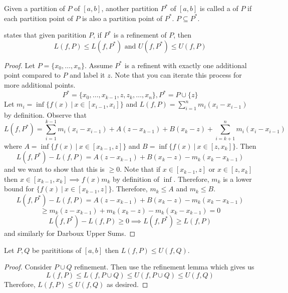 \documentclass[12pt]{scrartcl}
\begin{document}
\begin{definition}
  Given a partition of $P$ of $[a,b]$, another 
  partition $P^*$ of $[a,b]$ is called a  of $P$
  if each partition point of $P$ is also a partition point of $P^*$. $P \subseteq P^*$.
\end{definition}

\begin{lemma}
   states that given paritition $P$, 
  if $P^*$ is a refinement of $P$, then 
  \[L(f, P) \leq L(f, P^*) \text{ and } U(f, P^*) \leq U(f, P)\]
  \begin{proof}
    Let $P = \{x_0, \ldots, x_n\}$. Assume $P^*$ is a refinent with 
    exactly one additional point compared to $P$ and label it $z$. 
    Note that you can iterate this process for more additional points.
    \[P^* = \{x_0, \ldots, x_{k-1}, z, z_k, \ldots, x_n\}, P^* = P \cup \{z\}\]
    Let $m_i = \inf\{f(x) \ | \ x \in [x_{i-1}, x_i]\}$ and $L(f, P) = \sum_{i=1}^n m_i(x_i - x_{i-1})$ 
    by definition. Observe that 
    \[L(f, P^*) = \sum_{i=1}^{k-1} m_i(x_i - x_{i-1}) + A(z - x_{k-1}) + B(x_k - z) + \sum_{i=k+1}^n m_i(x_i - x_{i-1})\]
    where $A = \inf\{f(x) \ | \ x \in [x_{k-1}, z]\}$ and 
    $B = \inf\{f(x) \ | \ x \in [z, x_k]\}$. Then 
    \[L(f, P^*) - L(f, P) = A(z - x_{k-1}) + B(x_k - z) - m_k(x_k - x_{k-1})\]
    and we want to show that this is $\geq 0$. Note that if $x \in [x_{k-1}, z]$ or $x \in [z, x_k]$
    then $x \in [x_{k-1}, x_k] \implies f(x) m_k$ by definition of $\inf$. 
    Therefore, $m_k$ is a lower bound for $\{f(x) \ | \ x \in [x_{k-1}, z]\}$. Therefore, 
    $m_k \leq A$ and $m_k \leq B$. 
    \[L(f, P^*) - L(f, P) = A(z-x_{k-1}) + B(x_k - z) - m_k(x_k - x_{k-1})\]
    \[\geq m_k(z-x_{k-1}) + m_k(x_k - z) - m_k(x_k - x_{k-1}) = 0\]
    \[L(f, P^*) - L(f, P) \geq 0 \implies L(f, P^*) \geq L(f, P)\]
    and similarly for Darboux Upper Sums.
  \end{proof}
\end{lemma}

\begin{corollary}
  Let $P, Q$ be parititions of $[a,b]$ then 
  $L(f, P) \leq U(f, Q)$. 

  \begin{proof}
  Consider $P \cup Q$ refinement. Then use the refinement lemma which gives us 
  \[L(f, P) \leq L(f, P \cup Q) \leq U(f, P \cup Q) \leq U(f, Q)\]
  Therefore, $L(f, P) \leq U(f, Q)$ as desired.
  \end{proof}

\end{corollary}
\end{document}
